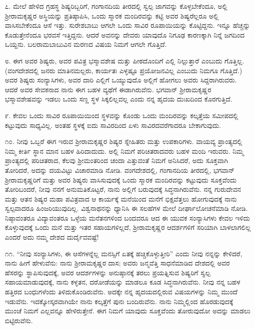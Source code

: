 ೭. ಮೇಲೆ ಹೇಳಿದ ಗ್ರಹಸ್ಥ ಶಿಷ್ಯರಿಬ್ಬರಿಗೆ, ಗಂಗಾನದಿಯ ತೀರದಲ್ಲಿ ಸ್ವಲ್ಪ ಜಾಗವನ್ನು ಕೊಳ್ಳಬೇಕೆಂದೂ, ಅಲ್ಲಿ ಶ‍್ರೀರಾಮಕೃಷ್ಣರ ಅಸ್ಥಿಯನ್ನು ಪ್ರತಿಷ್ಠಾಪಿಸಿ, ಒಂದು ಸ್ಮಾರಕ ಮಂದಿರವನ್ನು ಕಟ್ಟಿ ಅವರ ಶಿಷ್ಯರೆಲ್ಲರೂ ಅಲ್ಲಿ ವಾಸಿಸಬೇಕೆಂದೂ ಆಸೆ ಇತ್ತು. ಸುರೇಶಬಾಬು ಆಗಲೇ ಒಂದು ಸಾವಿರ ರೂಪಾಯಿಯನ್ನು ಕೊಟ್ಟಿದ್ದನು. ಇನ್ನೂ ಹೆಚ್ಚನ್ನು ಕೊಡುತ್ತೇನೆಂದೂ ಭರವಸೆ ಇತ್ತಿದ್ದನು. ಆದರೆ ಅವನನ್ನು ದೇವರು ಯಾವುದೊ ನಿಗೂಢ ಕಾರಣಕ್ಕಾಗಿ ನಿನ್ನೆ ಜಗದಿಂದ ಒಯ್ದನು. ಬಲರಾಮಬಾಬುವಿನ ಮರಣದ ವಿಷಯ ನಿಮಗೆ ಆಗಲೇ ಗೊತ್ತಿದೆ.

೮. ಈಗ ಅವರ ಶಿಷ್ಯರು, ಅವರ ಪವಿತ್ರ ಭಸ್ಮಾವಶೇಷ ಮತ್ತು ಪೀಠದೊಂದಿಗೆ ಎಲ್ಲಿ ನಿಲ್ಲುತ್ತಾರೆ ಎಂಬುದು ಗೊತ್ತಿಲ್ಲ. (ವಂಗದೇಶದಲ್ಲಿ ಜನರು ಮಾತಿನಮಲ್ಲರು, ಕಾರ್ಯತಃ ಎಳ್ಳಷ್ಟೂ ಪ್ರಯೋಜನವಿಲ್ಲ ಎಂಬುದು ನಿಮಗೂ ಗೊತ್ತಿದೆ.) ಅವರ ಶಿಷ್ಯರು ಸಂನ್ಯಾಸಿಗಳು, ಅವರ ದಾರಿ ಎಲ್ಲಿಗೆ ಒಯ್ಯುವುದೊ ಅಲ್ಲಿಗೆ ಹೋಗಲು ಅವರು ಸಿದ್ದರಾಗಿರುವರು. ಆದರೆ ಅವರ ಸೇವಕನಾದ ನಾನು ಈಗ ಬಹಳ ವ್ಯಥೆಗೆ ಈಡಾಗಿರುವೆನು. ಭಗವಾನ್ ಶ‍್ರೀರಾಮಕೃಷ್ಣರ ಭಸ್ಮಾವಶೇಷವನ್ನು ಇಡಲು ಒಂದು ಸಣ್ಣ ಸ್ಥಳ ಸಿಕ್ಕಲಿಲ್ಲವಲ್ಲ ಎಂದು ನನ್ನ ಹೃದಯ ದುಃಖದಿಂದ ಕೊರಗುತ್ತಿದೆ.

೯. ಕೇವಲ ಒಂದು ಸಾವಿರ ರೂಪಾಯಿಯಿಂದ ಸ್ಥಳವನ್ನು ಕೊಂಡು ಒಂದು ಮಂದಿರವನ್ನು ಕಲ್ಕತ್ತೆಯ ಸಮೀಪದಲ್ಲಿ ಕಟ್ಟುವುದು ಸಾಧ್ಯವಿಲ್ಲ. ಅಂತಹ ಸ್ಥಳಕ್ಕೆ ಐದು ಸಾವಿರದಿಂದ ಏಳು ಸಾವಿರದವರೆಗಾದರೂ ಬೇಕಾಗುವುದು.

೧೦. ನೀವು ಒಬ್ಬರೆ ಈಗ ಇರುವ ಶ‍್ರೀರಾಮಕೃಷ್ಣರ ಶಿಷ್ಯರ ಸ್ನೇಹಿತರು ಮತ್ತು ಉಪಕಾರಿಗಳು. ವಾಯವ್ಯ ಪ್ರಾಂತ್ಯದಲ್ಲಿ ನಿಮ್ಮ ಕೀರ್ತಿ ಸ್ಥಾನ ಮಾನ ಬಹಳ ಹಿರಿದಾದುದು. ಅಲ್ಲಿ ನಿಮಗೆ ಪರಿಚಿತರಾದವರು ಬಹಳ ಮಂದಿ ಇರುವರು. ನಿಮ್ಮ ಪ್ರಾಂತ್ಯದಲ್ಲಿ ಪರಿಚಿತರಾದ, ಕೆಲವು ಶ‍್ರೀಮಂತರಿಂದ ಚಂದಾ ಎತ್ತುವಂತೆ ನಿಮಗೆ ಅನಿಸಿದರೆ, ಅದು ಸೂಕ್ತವಾಗಿ ತೋರಿದರೆ, ಅದನ್ನು ದಯವಿಟ್ಟು ವಿಚಾರಮಾಡಿ ನೋಡಿ. ವಂಗದೇಶದಲ್ಲಿ, ಗಂಗಾನದಿಯ ತೀರದಲ್ಲಿ, ಭಗವಾನ್ ಶ‍್ರೀರಾಮಕೃಷ್ಣರಿಗೆ ಮತ್ತು ಅವರ ಶಿಷ್ಯರು ವಾಸಿಸುವುದಕ್ಕೆ ಒಂದು ಸ್ಮಾರಕ ಮಂದಿರವನ್ನು ಕಟ್ಟುವುದು ಸೂಕ್ತವೆಂದು ತೋರಿಬಂದರೆ, ನೀವು ನನಗೆ ಅನುಮತಿಕೊಟ್ಟರೆ, ನಾನು ಅಲ್ಲಿಗೆ ಬರುವುದಕ್ಕೆ ಸಿದ್ಧನಾಗಿರುವೆನು. ನನ್ನ ಗುರುದೇವನ ಮತ್ತು ಆತನ ಶಿಷ್ಯರ ಮಹಾ ಪವಿತ್ರವಾದ ಆ ಕಾರ್ಯಕ್ಕೆ ಮನೆಯಿಂದ ಮನೆಗೆ ಭಿಕ್ಷವೆತ್ತಲು ಹೋಗುವುದಕ್ಕೆ ನಾನು ಸ್ವಲ್ಪವಾದರೂ ಹಿಂಜರಿಯುವುದಿಲ್ಲ. ವಿಶ್ವನಾಥನನ್ನು ಧ್ಯಾನಿಸಿ ಈ ಸಲಹೆಗಳ ಮೇಲೆ ದೀರ್ಘಾಲೋಚನೆಮಾಡಿ ನೋಡಿ. ನಿಷ್ಠಾವಂತರೂ ವಿದ್ಯಾವಂತರೂ ಒಳ್ಳೆಯ ಮನೆತನಗಳಿಂದ ಬಂದವರೂ ಆದ ಈ ಯುವಕ ಸಂನ್ಯಾಸಿಗಳು ಕೇವಲ ಇಳಿದು ಕೊಳ್ಳುವುದಕ್ಕೆ ಒಂದು ಮನೆ ಮತ್ತು ಇತರ ಸಹಾಯಗಳಿಲ್ಲದೆ, ಶ‍್ರೀರಾಮಕೃಷ್ಣರ ಆದರ್ಶಗಳಿಗೆ ಸರಿಯಾಗಿ ಬಾಳಲಾಗಲಿಲ್ಲ ಎಂದರೆ ಅದು ನಮ್ಮ ದೇಶದ ದುರ್ದೈವವಷ್ಟೆ!

೧೧. “ನೀವು ಸಂನ್ಯಾಸಿಗಳು, ಈ ಆಸೆಗಳನ್ನೆಲ್ಲ ಮನಸ್ಸಿಗೆ ಏತಕ್ಕೆ ಹಚ್ಚಿಕೊಳ್ಳುತ್ತೀರಿ” ಎಂದು ನೀವು ನನ್ನನ್ನು ಕೇಳಿದರೆ, ನಾನು ಹೀಗೆ ಹೇಳುವೆನು: ನಾನು ಶ‍್ರೀರಾಮಕೃಷ್ಣರ ದಾಸ; ಅವರು ಜನ್ಮವೆತ್ತಿ ಸಾಧನೆಮಾಡಿದ ದೇಶದಲ್ಲಿ ಅವರ ಹೆಸರನ್ನು ಸ್ಥಾಪಿಸುವುದಕ್ಕೆ, ಅವರ ಆದರ್ಶಗಳನ್ನು ಅನುಷ್ಠಾನಕ್ಕೆ ತರಲು ಪ್ರಯತ್ನಿಸುವ ಶಿಷ್ಯರಿಗೆ ಸ್ವಲ್ಪ ಸಹಾಯಮಾಡುವುದಕ್ಕೆ, ನಾನು ಕಳ್ಳತನ, ದರೋಡೆಯನ್ನು ಮಾಡಲೂ ಕೂಡ ಸಿದ್ಧನಾಗಿರುವೆನು. ನೀವು ನನ್ನ ಬಹಳ ಹತ್ತಿರದ ಬಂಧುಗಳೆಂದು ತಿಳಿದುಕೊಂಡಿರುವೆನು. ಅದಕ್ಕೇ ನನ್ನ ಹೃದಯದಲ್ಲಿರುವ ವಿಷಯಗಳನ್ನು ನಿಮ್ಮ ಮುಂದೆ ಇಡುವೆನು. ಇದಕ್ಕೋಸ್ಕರವಾಗಿಯೇ ನಾನು ಕಲ್ಕತ್ತೆಗೆ ಪುನಃ ಬಂದಿರುವೆನು. ನಾನು ನಿಮ್ಮಲ್ಲಿಂದ ಹೊರಡುವುದಕ್ಕೆ ಮುಂಚೆ ನಿಮಗೆ ಎಲ್ಲವನ್ನೂ ಹೇಳಿರುತ್ತೇನೆ. ಈಗ ನಿಮಗೆ ಯಾವುದು ಸೂಕ್ತವೆಂದು ತೋರುವುದೋ ಅದನ್ನು ಮಾಡಲು ಬಿಟ್ಟಿರುವೆನು.

